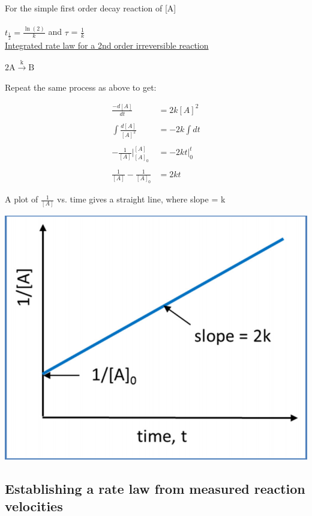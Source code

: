 \documentclass[12pt, letterpaper]{article}
\begin{document}
    For the simple first order decay reaction of [A] \\ \\
    \( t_{\frac{1}{2}} = \frac{\ln(2)}{k} \) and $\tau$ = $\frac{1}{k}$\\

    \underline{Integrated rate law for a 2nd order irreversible reaction}

    \(2\mathrm{A} \stackrel{\mathrm{k}}{\longrightarrow} \mathrm{B} \)

    Repeat the same process as above to get: 

    \begin{align*}
        \frac{-d[A]}{dt} &= 2k[A]^2 \\ \\
        \int \frac{d[A]}{[A]^2} &= -2k \int dt \\ \\
        -\frac{1}{[A]} |_{[A]_0} ^{[A]} &= -\left.2k t\right|_0 ^t \\ \\ 
        \frac{1}{[A]} - \frac{1}{[A]_0} &= 2kt
    \end{align*}
    
    A plot of $\frac{1}{[A]}$ vs. time gives a straight line, where slope = k

    \begin{center}
        \includegraphics[scale = 0.35]{Rate Law Graph.png}
    \end{center}
    
    \subsection*{Establishing a rate law from measured reaction velocities}
    
\end{document}
